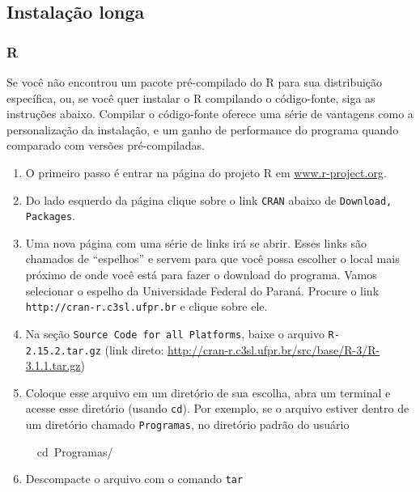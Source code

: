 \documentclass[a4paper,12pt]{article}\usepackage[]{graphicx}\usepackage[]{color}
\makeatletter
\newcommand{\hlopt}[1]{\textcolor[rgb]{0,0,0}{#1}}%
\newcommand{\hlstd}[1]{\textcolor[rgb]{0.345,0.345,0.345}{#1}}%
\newcommand{\hlkwb}[1]{\textcolor[rgb]{0.69,0.353,0.396}{#1}}%
\newenvironment{kframe}{%
 \def\at@end@of@kframe{}%
 \ifinner\ifhmode%
  \def\at@end@of@kframe{\end{minipage}}%
  \begin{minipage}{\columnwidth}%
 \fi\fi%
 \def\FrameCommand##1{\hskip\@totalleftmargin \hskip-\fboxsep
 \colorbox{shadecolor}{##1}\hskip-\fboxsep
     \hskip-\linewidth \hskip-\@totalleftmargin \hskip\columnwidth}%
 \MakeFramed {\advance\hsize-\width
   \@totalleftmargin\z@ \linewidth\hsize
   \@setminipage}}%
 {\par\unskip\endMakeFramed%
 \at@end@of@kframe}
\newenvironment{knitrout}{}{} %
\providecommand{\R}{\textsf{R}\xspace}
\makeatother
\begin{document}
\subsection{Instalação longa}
\label{sec:ill}

\subsubsection{\R}

Se você não encontrou um pacote pré-compilado do \R para sua
distribuição específica, ou, se você quer instalar o \R compilando o
código-fonte, siga as instruções abaixo. Compilar o código-fonte oferece
uma série de vantagens como a personalização da instalação, e um ganho
de performance do programa quando comparado com versões pré-compiladas.

\begin{enumerate}
\item O primeiro passo é entrar na página do projeto \R em
\url{www.r-project.org}.
\item Do lado esquerdo da página clique sobre o link \texttt{CRAN}
  abaixo de \texttt{Download, Packages}.
\item Uma nova página com uma série de links irá se abrir. Esses links
  são chamados de ``espelhos'' e servem para que você possa escolher o
  local mais próximo de onde você está para fazer o download do
  programa. Vamos selecionar o espelho da Universidade Federal do
  Paraná. Procure o link \texttt{http://cran-r.c3sl.ufpr.br} e clique sobre
  ele.
\item Na seção \texttt{Source Code for all Platforms}, baixe o arquivo
  \texttt{R-2.15.2.tar.gz} (link direto:
  \url{http://cran-r.c3sl.ufpr.br/src/base/R-3/R-3.1.1.tar.gz})
\item Coloque esse arquivo em um diretório de sua escolha, abra um
  terminal e acesse esse diretório (usando \texttt{cd}). Por exemplo, se
  o arquivo estiver dentro de um diretório chamado \texttt{Programas},
  no diretório padrão do usuário
\begin{knitrout}\small
{}\color{fgcolor}\begin{kframe}
\noindent
\ttfamily
\hlstd{}\hlstd{\ \ }\hlstd{}\hlkwb{cd\ }\hlstd{Programas}\hlopt{/}\hlstd{}\hspace*{\fill}
\mbox{}
\normalfont
\normalsize
\end{kframe}
\end{knitrout}
\item Descompacte o arquivo com o comando \texttt{tar}

\end{enumerate}
\end{document}
